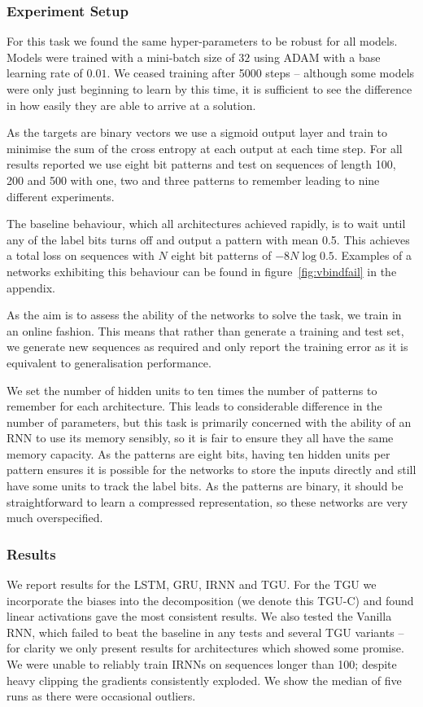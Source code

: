 \subsubsection{Experiment Setup}
For this task we found the same hyper-parameters to be robust for all models.
Models were trained with a mini-batch size of \(32\) using ADAM with a base learning rate of \(0.01\).
We ceased training after 5000 steps --  although some models were only just beginning to learn
by this time, it is sufficient to see the difference in how easily they are able to arrive
at a solution.

As the targets are binary vectors we use a sigmoid output layer and train to minimise the
sum of the cross entropy at each output at each time step.
For all results reported we use eight bit patterns and test on sequences of length 100, 200 and 500
with one, two and three patterns to remember leading to nine different experiments.

The baseline behaviour, which all architectures achieved rapidly,
is to wait until any of the label bits turns off and output a pattern with mean 0.5. This
achieves a total loss on sequences with \(N\) eight bit patterns of \(-8N\log 0.5\).
Examples of a networks exhibiting this behaviour can be found in figure~\ref{fig:vbindfail}
in the appendix.

As the aim is to assess the ability of the networks to solve the task, we train in an online
fashion. This means that rather than generate a training and test set, we generate new sequences
as required and only report the training error as it is equivalent to generalisation
performance.

We set the number of hidden units to ten times the number of patterns to remember for each architecture.
This leads to considerable difference in the number of parameters, but this task is primarily
concerned with the ability of an RNN to use its memory sensibly, so it is fair to ensure they
all have the same memory capacity. As the patterns are eight bits, having ten hidden units
per pattern ensures it is possible for the networks to store the inputs directly and still have
some units to track the label bits. As the patterns are binary, it should be
straightforward to learn a compressed representation, so these networks are very much overspecified.

\subsubsection{Results}
We report results for the LSTM, GRU, IRNN and TGU. For the TGU we incorporate the biases into
the decomposition (we denote this TGU-C) and found linear activations gave the
most consistent results. We also tested the Vanilla RNN, which failed to beat the baseline in
any tests and several TGU variants -- for clarity we only present results for architectures which
showed some promise. We were unable to reliably train IRNNs on sequences longer than
100; despite heavy clipping the gradients
consistently exploded. We show the median of five runs as there were occasional outliers.

